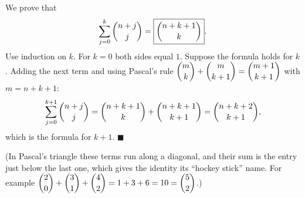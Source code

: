 We prove that
\[\sum_{j=0}^{k}\dbinom{n+j}{j}=\boxed{\dbinom{n+k+1}{k}}.\]
Use induction on $k$. For $k=0$ both sides equal $1$. Suppose the formula holds for $k$. Adding the next term and using Pascal's rule $\dbinom{m}{k}+\dbinom{m}{k+1}=\dbinom{m+1}{k+1}$ with $m=n+k+1$:
\[\sum_{j=0}^{k+1}\dbinom{n+j}{j}=\dbinom{n+k+1}{k}+\dbinom{n+k+1}{k+1}=\dbinom{n+k+2}{k+1},\]
which is the formula for $k+1$. $\blacksquare$

(In Pascal's triangle these terms run along a diagonal, and their sum is the entry just below the last one, which gives the identity its ``hockey stick'' name. For example $\dbinom20+\dbinom31+\dbinom42=1+3+6=10=\dbinom52$.)
